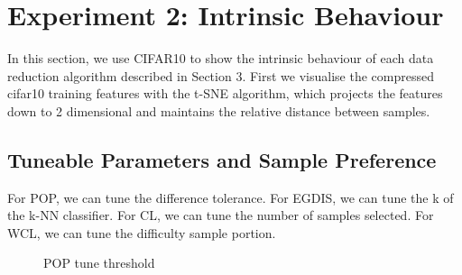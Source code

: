 \section{Experiment 2: Intrinsic Behaviour}
In this section, we use CIFAR10 to show the intrinsic behaviour of each data reduction algorithm described in Section 3. First we visualise the compressed cifar10 training features with the t-SNE algorithm, which projects the features down to 2 dimensional and maintains the relative distance between samples.

\subsection{Tuneable Parameters and Sample Preference}
For POP, we can tune the difference tolerance. For EGDIS, we can tune the k of the k-NN classifier. For CL, we can tune the number of samples selected. For WCL, we can tune the difficulty sample portion.

\begin{figure}[H]
\centering  
{}
\caption{POP tune threshold}
\label{Fig.popcifar10}
\end{figure}


